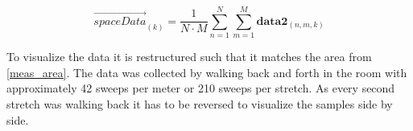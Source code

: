 \begin{equation}\label{eq:spaceMean}
\overrightarrow{spaceData}_{(k)} = \frac{1}{N\cdot M}\sum_{n = 1}^{N}\sum_{m = 1}^{M} \textbf{data2}_{(n,m,k)}
\end{equation}
\begin{where}
\end{where}


To visualize the data it is restructured such that it matches the area from \autoref{meas_area}. The data was collected by walking back and forth in the room with approximately 42 sweeps per meter or 210 sweeps per stretch. As every second stretch was walking back it has to be reversed to visualize the samples side by side. 



